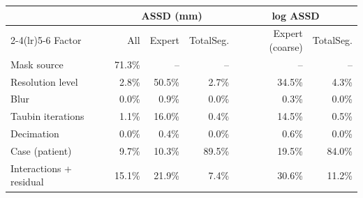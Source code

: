 \begin{tabular}{lrrrrr}
\toprule
& \multicolumn{3}{c}{ASSD (mm)} & \multicolumn{2}{c}{log ASSD} \\
\cmidrule(lr){2-4}\cmidrule(lr){5-6}
Factor & All & Expert & TotalSeg. & Expert (coarse) & TotalSeg. \\
\midrule
Mask source & 71.3\% & -- & -- & -- & -- \\
Resolution level & 2.8\% & 50.5\% & 2.7\% & 34.5\% & 4.3\% \\
Blur & 0.0\% & 0.9\% & 0.0\% & 0.3\% & 0.0\% \\
Taubin iterations & 1.1\% & 16.0\% & 0.4\% & 14.5\% & 0.5\% \\
Decimation & 0.0\% & 0.4\% & 0.0\% & 0.6\% & 0.0\% \\
Case (patient) & 9.7\% & 10.3\% & 89.5\% & 19.5\% & 84.0\% \\
\midrule
Interactions + residual & 15.1\% & 21.9\% & 7.4\% & 30.6\% & 11.2\% \\
\bottomrule
\end{tabular}
